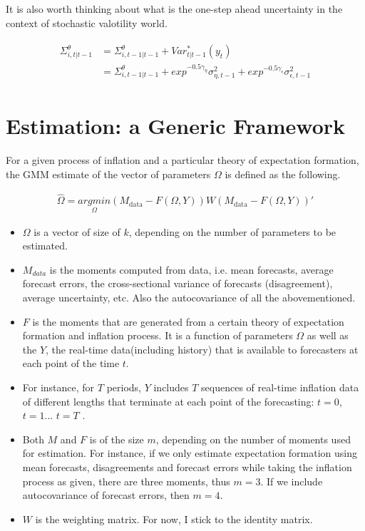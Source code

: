 \documentclass[]{article}
\begin{document}
It is also worth thinking about what is the one-step ahead uncertainty in the context of stochastic valotility world. 


\begin{eqnarray}
\begin{split}
\Sigma^\theta_{i,t|t-1} & = \Sigma^\theta_{i,t-1|t-1} + Var^*_{t|t-1}(y_t) \\
& = \Sigma^\theta_{i,t-1|t-1} +  exp^{- 0.5\gamma_{\eta}} \sigma^2_{\eta,t-1}  +  exp^{- 0.5\gamma_{\epsilon}} \sigma^2_{\epsilon,t-1} 
\end{split}
\end{eqnarray}


\section{Estimation: a Generic Framework}

For a given process of inflation and a particular theory of expectation formation, the GMM estimate of the vector of parameters $\Omega$ is defined as the following. 

\begin{eqnarray}
\widehat \Omega = \underset{\Omega }{argmin} (M_{\textrm{data} } - F(\Omega, Y)) W  (M_{\textrm{data} } - F(\Omega, Y))'
\end{eqnarray}

\begin{itemize}
	\item  $\Omega$ is a vector of size of $k$, depending on the number of parameters to be estimated. 
	\item $M_{data}$ is the moments computed from data, i.e. mean forecasts, average forecast errors, the cross-sectional variance of forecasts (disagreement), average uncertainty, etc. Also the autocovariance of all the abovementioned.  
	
	\item $F$ is the moments that are generated from a certain theory of expectation formation and inflation process. It is a function of parameters $\Omega$ as well as the $Y$, the real-time data(including history) that is available to forecasters at each point of the time $t$. 
	\item For instance, for $T$ periods, $Y$ includes $T$  sequences of real-time inflation data of different lengths that terminate at each point of the forecasting:  $t =0$, $t=1$... $t=T$ . 
	\item  Both $M$ and $F$ is of the size  $m$, depending on the number of moments used for estimation. For instance, if we only estimate expectation formation using mean forecasts, disagreements and forecast errors while taking the inflation process as given, there are three moments, thus $m = 3$. If we include autocovariance of forecast errors, then $m=4$.  
	
	\item $W$ is the weighting matrix. For now, I stick to the identity matrix. 
\end{itemize}
\end{document}
